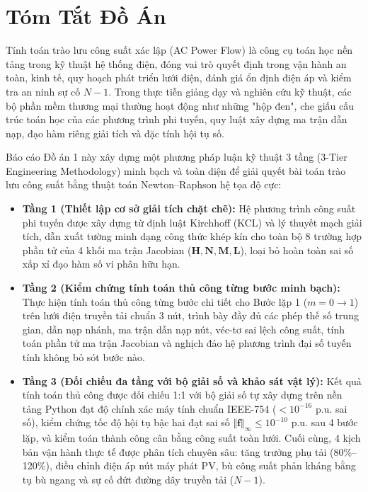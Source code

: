 \documentclass[12pt,a4paper,oneside]{report}
\begin{document}
\clearpage

\chapter*{Tóm Tắt Đồ Án}

Tính toán trào lưu công suất xác lập (AC Power Flow) là công cụ toán học nền tảng trong kỹ thuật hệ thống điện, đóng vai trò quyết định trong vận hành an toàn, kinh tế, quy hoạch phát triển lưới điện, đánh giá ổn định điện áp và kiểm tra an ninh sự cố $N-1$. Trong thực tiễn giảng dạy và nghiên cứu kỹ thuật, các bộ phần mềm thương mại thường hoạt động như những "hộp đen", che giấu cấu trúc toán học của các phương trình phi tuyến, quy luật xây dựng ma trận dẫn nạp, đạo hàm riêng giải tích và đặc tính hội tụ số.

Báo cáo Đồ án 1 này xây dựng một phương pháp luận kỹ thuật 3 tầng (3-Tier Engineering Methodology) minh bạch và toàn diện để giải quyết bài toán trào lưu công suất bằng thuật toán Newton--Raphson hệ tọa độ cực:
\begin{itemize}
    \item \textbf{Tầng 1 (Thiết lập cơ sở giải tích chặt chẽ):} Hệ phương trình công suất phi tuyến được xây dựng từ định luật Kirchhoff (KCL) và lý thuyết mạch giải tích, dẫn xuất tường minh dạng công thức khép kín cho toàn bộ 8 trường hợp phần tử của 4 khối ma trận Jacobian ($\mathbf{H}, \mathbf{N}, \mathbf{M}, \mathbf{L}$), loại bỏ hoàn toàn sai số xấp xỉ đạo hàm số vi phân hữu hạn.
    \item \textbf{Tầng 2 (Kiểm chứng tính toán thủ công từng bước minh bạch):} Thực hiện tính toán thủ công từng bước chi tiết cho Bước lặp 1 ($m = 0 \to 1$) trên lưới điện truyền tải chuẩn 3 nút, trình bày đầy đủ các phép thế số trung gian, dẫn nạp nhánh, ma trận dẫn nạp nút, véc-tơ sai lệch công suất, tính toán phần tử ma trận Jacobian và nghịch đảo hệ phương trình đại số tuyến tính không bỏ sót bước nào.
    \item \textbf{Tầng 3 (Đối chiếu đa tầng với bộ giải số và khảo sát vật lý):} Kết quả tính toán thủ công được đối chiếu 1:1 với bộ giải số tự xây dựng trên nền tảng Python đạt độ chính xác máy tính chuẩn IEEE-754 ($< 10^{-16}\text{ p.u.}$ sai số), kiểm chứng tốc độ hội tụ bậc hai đạt sai số $\Vert \mathbf{f} \Vert_\infty \le 10^{-10}\text{ p.u.}$ sau 4 bước lặp, và kiểm toán thành công cân bằng công suất toàn lưới. Cuối cùng, 4 kịch bản vận hành thực tế được phân tích chuyên sâu: tăng trưởng phụ tải (80\%--120\%), điều chỉnh điện áp nút máy phát PV, bù công suất phản kháng bằng tụ bù ngang và sự cố đứt đường dây truyền tải ($N-1$).
\end{itemize}
\end{document}
